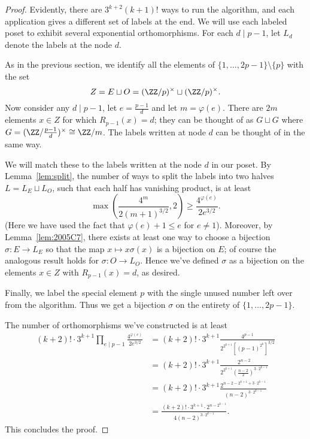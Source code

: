 \begin{proof}
Evidently, there are $3^{k+2} (k+1)!$ ways to run the algorithm,
and each application gives a different set of labels at the end.
We will use each labeled poset to exhibit several exponential orthomorphisms.
For each $d \mid p-1$, let $L_d$ denote the labels at the node $d$.

As in the previous section,
we identify all the elements of $\{1, \dots, 2p-1\} \setminus \{p\}$
with the set
\[ Z = E \sqcup O = (\ZZ/p)^\times \sqcup (\ZZ/p)^\times. \]
Now consider any $d \mid p-1$, let $e= \frac{p-1}{d}$
and let $m = \varphi(e)$.
There are $2m$ elements $x \in Z$
for which $R_{p-1}(x) = d$;
they can be thought of as $G \sqcup G$ where
$G = (\ZZ/\frac{p-1}{d})^\times \cong \ZZ/m$.
The labels written at node $d$ can be thought of in the same way.

We will match these to the labels written at the node $d$ in our poset.
By Lemma~\ref{lem:split}, the number of ways to split the labels 
into two halves $L = L_E \sqcup L_O$,
such that each half has vanishing product,
is at least
\[ \max\left(\frac{4^{m}}{2(m+1)^{3/2}}, 2\right)
	\ge \frac{4^{\varphi(e)}}{2e^{3/2}}. \]
(Here we have used the fact that $\varphi(e)+1 \le e$ for $e \neq 1$).
Moreover, by Lemma~\ref{lem:2005C7},
there exists at least one way to choose a bijection
$\sigma \colon E \to L_E$ so that the map $x \mapsto x\sigma(x)$
is a bijection on $E$;
of course the analogous result holds for $\sigma \colon O \to L_O$.
Hence we've defined $\sigma$ as a bijection
on the elements $x \in Z$ with $R_{p-1}(x) = d$, as desired.

Finally, we label the special element $p$
with the single unused number left over from the algorithm.
Thus we get a bijection $\sigma$ on
the entirety of $\{1, \dots, 2p-1\}$.

The number of orthomorphisms we've constructed is at least
\begin{align*}
	(k+2)! \cdot 3^{k+1}
	\prod_{e \mid p-1} \frac{4^{\varphi(e)}}{2e^{3/2}}
	&= (k+2)! \cdot 3^{k+1}
	\frac{4^{p-1}}{2^{2^{k+1}} \left[ (p-1)^{2^k} \right]^{3/2}} \\
	&= (k+2)! \cdot 3^{k+1}
	\frac{2^{n-2}}{2^{2^{k+1}} \left( \frac{n-2}{2} \right)^{3 \cdot 2^{k-1}}} \\
	&= (k+2)! \cdot 3^{k+1}
	\frac{2^{n-2-2^{k+1}+3\cdot2^{k-1}}}{(n-2)^{3 \cdot 2^{k-1}}} \\
	&= \frac{(k+2)! \cdot 3^{k+1} \cdot
		2^{n-2^{k-1}}}{4(n-2)^{3 \cdot 2^{k-1}}}.
\end{align*}
This concludes the proof.
\end{proof}
